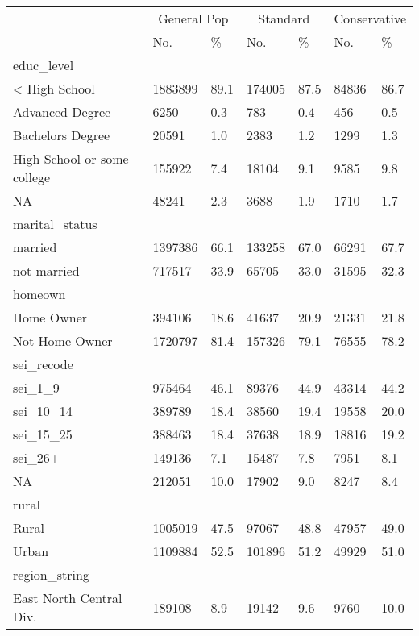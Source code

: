 \captionsetup[table]{labelformat=empty,skip=1pt}
\begin{longtable}{lllllll}
\toprule
& \multicolumn{2}{c}{General Pop} & \multicolumn{2}{c}{Standard} & \multicolumn{2}{c}{Conservative} \\ 
 \cmidrule(lr){2-3}\cmidrule(lr){4-5}\cmidrule(lr){6-7}
 & No. & \% & No. & \% & No. & \% \\ 
\midrule
\multicolumn{1}{l}{educ\_level} \\ 
\midrule
< High School & 1883899 & 89.1 & 174005 & 87.5 & 84836 & 86.7 \\ 
Advanced Degree & 6250 & 0.3 & 783 & 0.4 & 456 & 0.5 \\ 
Bachelors Degree & 20591 & 1.0 & 2383 & 1.2 & 1299 & 1.3 \\ 
High School or some college & 155922 & 7.4 & 18104 & 9.1 & 9585 & 9.8 \\ 
NA & 48241 & 2.3 & 3688 & 1.9 & 1710 & 1.7 \\ 
\midrule
\multicolumn{1}{l}{marital\_status} \\ 
\midrule
married & 1397386 & 66.1 & 133258 & 67.0 & 66291 & 67.7 \\ 
not married & 717517 & 33.9 & 65705 & 33.0 & 31595 & 32.3 \\ 
\midrule
\multicolumn{1}{l}{homeown} \\ 
\midrule
Home Owner & 394106 & 18.6 & 41637 & 20.9 & 21331 & 21.8 \\ 
Not Home Owner & 1720797 & 81.4 & 157326 & 79.1 & 76555 & 78.2 \\ 
\midrule
\multicolumn{1}{l}{sei\_recode} \\ 
\midrule
sei\_1\_9 & 975464 & 46.1 & 89376 & 44.9 & 43314 & 44.2 \\ 
sei\_10\_14 & 389789 & 18.4 & 38560 & 19.4 & 19558 & 20.0 \\ 
sei\_15\_25 & 388463 & 18.4 & 37638 & 18.9 & 18816 & 19.2 \\ 
sei\_26+ & 149136 & 7.1 & 15487 & 7.8 & 7951 & 8.1 \\ 
NA & 212051 & 10.0 & 17902 & 9.0 & 8247 & 8.4 \\ 
\midrule
\multicolumn{1}{l}{rural} \\ 
\midrule
Rural & 1005019 & 47.5 & 97067 & 48.8 & 47957 & 49.0 \\ 
Urban & 1109884 & 52.5 & 101896 & 51.2 & 49929 & 51.0 \\ 
\midrule
\multicolumn{1}{l}{region\_string} \\ 
\midrule
East North Central Div. & 189108 & 8.9 & 19142 & 9.6 & 9760 & 10.0 \\ 

\end{longtable}
